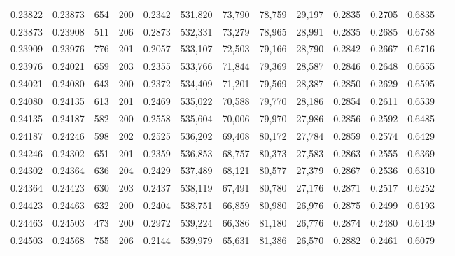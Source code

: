 \begin{tabular}{rrrrrrrrrrrrr}
0.23822 & 0.23873 &   654 & 200 &                                     0.2342 & 531,820 &  73,790 &  78,759 &  29,197 & 0.2835 & 0.2705 & 0.6835 \\
0.23873 & 0.23908 &   511 & 206 &                                     0.2873 & 532,331 &  73,279 &  78,965 &  28,991 & 0.2835 & 0.2685 & 0.6788 \\
0.23909 & 0.23976 &   776 & 201 &                                     0.2057 & 533,107 &  72,503 &  79,166 &  28,790 & 0.2842 & 0.2667 & 0.6716 \\
0.23976 & 0.24021 &   659 & 203 &                                     0.2355 & 533,766 &  71,844 &  79,369 &  28,587 & 0.2846 & 0.2648 & 0.6655 \\
0.24021 & 0.24080 &   643 & 200 &                                     0.2372 & 534,409 &  71,201 &  79,569 &  28,387 & 0.2850 & 0.2629 & 0.6595 \\
0.24080 & 0.24135 &   613 & 201 &                                     0.2469 & 535,022 &  70,588 &  79,770 &  28,186 & 0.2854 & 0.2611 & 0.6539 \\
0.24135 & 0.24187 &   582 & 200 &                                     0.2558 & 535,604 &  70,006 &  79,970 &  27,986 & 0.2856 & 0.2592 & 0.6485 \\
0.24187 & 0.24246 &   598 & 202 &                                     0.2525 & 536,202 &  69,408 &  80,172 &  27,784 & 0.2859 & 0.2574 & 0.6429 \\
0.24246 & 0.24302 &   651 & 201 &                                     0.2359 & 536,853 &  68,757 &  80,373 &  27,583 & 0.2863 & 0.2555 & 0.6369 \\
0.24302 & 0.24364 &   636 & 204 &                                     0.2429 & 537,489 &  68,121 &  80,577 &  27,379 & 0.2867 & 0.2536 & 0.6310 \\
0.24364 & 0.24423 &   630 & 203 &                                     0.2437 & 538,119 &  67,491 &  80,780 &  27,176 & 0.2871 & 0.2517 & 0.6252 \\
0.24423 & 0.24463 &   632 & 200 &                                     0.2404 & 538,751 &  66,859 &  80,980 &  26,976 & 0.2875 & 0.2499 & 0.6193 \\
0.24463 & 0.24503 &   473 & 200 &                                     0.2972 & 539,224 &  66,386 &  81,180 &  26,776 & 0.2874 & 0.2480 & 0.6149 \\
0.24503 & 0.24568 &   755 & 206 &                                     0.2144 & 539,979 &  65,631 &  81,386 &  26,570 & 0.2882 & 0.2461 & 0.6079 \\

\end{tabular}
